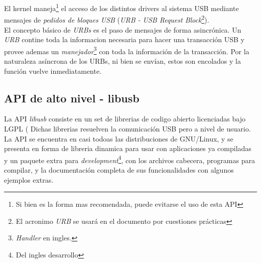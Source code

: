 El kernel maneja\footnote{Si bien es la forma mas recomendada, puede evitarse
el uso de esta API} el acceso de los distintos drivers al sistema USB mediante
mensajes de \emph{pedidos de bloques USB} (\emph{URB - USB Request
Block}\footnote{El acronimo \emph{URB} se usar\'a en el documento por
cuestiones pr\'acticas}).\\

El concepto b\'asico de \emph{URBs} es el paso de mensajes de forma
asincr\'onica. 
Un \emph{URB} contine toda la informacion necesaria para hacer una
transacci\'on USB y provee ademas un \emph{manejador}\footnote{\emph{Handler}
en ingles.} con toda la informaci\'on de la transacci\'on.
Por la naturaleza as\'incrona de los URBs, ni bien se env\'ian, estos son
encolados y la funci\'on vuelve inmediatamente. 



\subsection{API de alto nivel - libusb}

La API \emph{libusb} consiste en un set de librerias de codigo abierto
licenciadas bajo LGPL (%
Dichas librerias resuelven la comunicaci\'on
USB pero a nivel de usuario.
La API se encuentra en casi todoas las distribuciones de GNU/Linux, y se
presenta en forma de libreria dinamica para usar con aplicaciones ya
compiladas y un paquete extra para \emph{development}\footnote{Del ingles
desarrollo}, con los archivos cabecera, programas para compilar, y
la documentaci\'on completa de sus funcionalidades con algunos ejemplos
extras. \\

